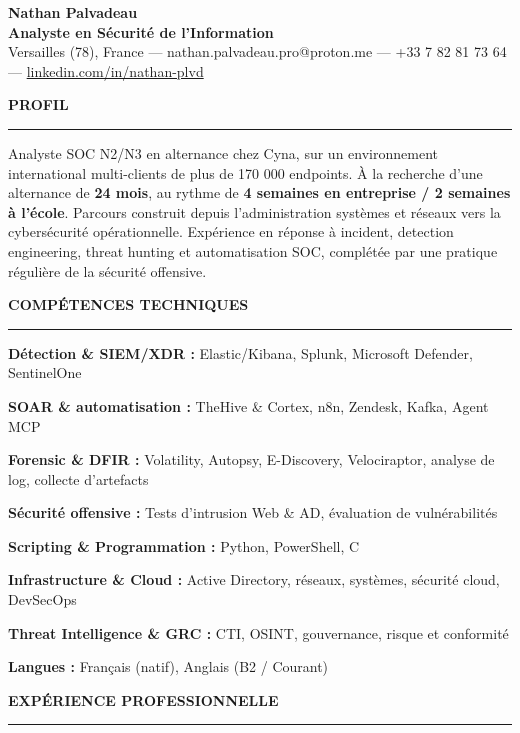\documentclass[10pt,a4paper]{article}
\newlength{\gNameRole}   \setlength{\gNameRole}   {1.9pt}
\newlength{\gRoleContact}\setlength{\gRoleContact}{2.0pt}
\newlength{\gBeforeSec}  \setlength{\gBeforeSec}  {4.2pt}  %
\newlength{\gSecRule}    \setlength{\gSecRule}    {1.2pt}  %
\newlength{\gRuleBody}   \setlength{\gRuleBody}   {1.9pt}  %
\newcommand{\cvsection}[1]{%
  \vspace{\gBeforeSec}%
  {\large\bfseries #1}\par
  \vspace{\gSecRule}%
  \hrule
  \vspace{\gRuleBody}%
}
\newcommand{\skillline}[2]{\textbf{#1 :} #2\par}
\begin{document}
\begin{center}
  {\huge\bfseries Nathan Palvadeau}\\[\gNameRole]
  {\Large\bfseries Analyste en Sécurité de l'Information }\\[\gRoleContact]
  Versailles (78), France — nathan.palvadeau.pro@proton.me — +33 7 82 81 73 64 —
  \href{https://linkedin.com/in/nathan-plvd}{linkedin.com/in/nathan-plvd}
\end{center}

\cvsection{PROFIL}
Analyste SOC N2/N3 en alternance chez Cyna, sur un environnement international multi-clients de plus de 170 000 endpoints.
À la recherche d'une alternance de \textbf{24 mois}, au rythme de \textbf{4 semaines en entreprise / 2 semaines à l'école}.
Parcours construit depuis l'administration systèmes et réseaux vers la cybersécurité opérationnelle. Expérience en réponse à incident, detection engineering, threat hunting et automatisation SOC, complétée par une pratique régulière de la sécurité offensive.

\cvsection{COMPÉTENCES TECHNIQUES}
\skillline{Détection \& SIEM/XDR}{Elastic/Kibana, Splunk, Microsoft Defender, SentinelOne}
\skillline{SOAR \& automatisation}{TheHive \& Cortex, n8n, Zendesk, Kafka, Agent MCP}
\skillline{Forensic \& DFIR}{Volatility, Autopsy, E-Discovery, Velociraptor, analyse de log, collecte d'artefacts}
\skillline{Sécurité offensive}{Tests d'intrusion Web \& AD, évaluation de vulnérabilités}
\skillline{Scripting \& Programmation}{Python, PowerShell, C}
\skillline{Infrastructure \& Cloud}{Active Directory, réseaux, systèmes, sécurité cloud, DevSecOps}
\skillline{Threat Intelligence \& GRC}{CTI, OSINT, gouvernance, risque et conformité}
\skillline{Langues}{Français (natif), Anglais (B2 / Courant)}

\cvsection{EXPÉRIENCE PROFESSIONNELLE}
\end{document}
